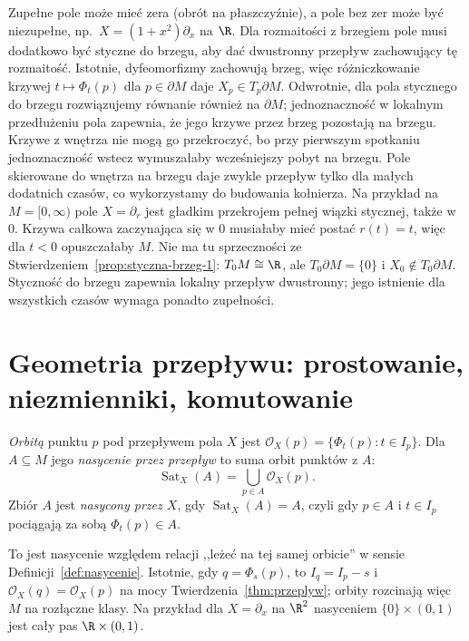 \begin{uwaga}
Zupełne pole może mieć zera (obrót na płaszczyźnie), a pole bez zer
może być niezupełne, np.\ $X=(1+x^2)\partial_x$ na $\R$.
Dla rozmaitości z brzegiem pole musi dodatkowo być styczne do brzegu,
aby dać dwustronny przepływ zachowujący tę rozmaitość.
Istotnie, dyfeomorfizmy zachowują brzeg, więc różniczkowanie
krzywej $t\mapsto\Phi_t(p)$ dla $p\in\partial M$ daje
$X_p\in T_p\partial M$. Odwrotnie, dla pola stycznego do brzegu
rozwiązujemy równanie również na $\partial M$; jednoznaczność
w lokalnym przedłużeniu pola zapewnia, że jego krzywe przez
brzeg pozostają na brzegu. Krzywe z wnętrza nie mogą go
przekroczyć, bo przy pierwszym spotkaniu jednoznaczność wstecz
wymuszałaby wcześniejszy pobyt na brzegu.
Pole skierowane do wnętrza na brzegu daje zwykle przepływ tylko
dla małych dodatnich czasów, co wykorzystamy do budowania kołnierza.
Na przykład na $M=[0,\infty)$ pole $X=\partial_r$ jest gładkim
przekrojem pełnej wiązki stycznej, także w $0$.
Krzywa całkowa zaczynająca się w $0$ musiałaby mieć postać
$r(t)=t$, więc dla $t<0$ opuszczałaby $M$.
Nie ma tu sprzeczności ze Stwierdzeniem~\ref{prop:styczna-brzeg-1}:
$T_0M\cong\R$, ale $T_0\partial M=\{0\}$ i $X_0\notin T_0\partial M$.
Styczność do brzegu zapewnia lokalny przepływ dwustronny;
jego istnienie dla wszystkich czasów wymaga ponadto zupełności.
\end{uwaga}

\section{Geometria przepływu: prostowanie, niezmienniki, komutowanie}
\label{sec:prostowanie}

\begin{definicja}
\emph{Orbitą} punktu $p$ pod przepływem pola $X$ jest
$\mathcal O_X(p)=\{\Phi_t(p):t\in I_p\}$.
Dla $A\subseteq M$ jego \emph{nasycenie przez przepływ}
to suma orbit punktów z $A$:
\[
 \operatorname{Sat}_X(A)=\bigcup_{p\in A}\mathcal O_X(p).
\]
Zbiór $A$ jest \emph{nasycony przez $X$}, gdy
$\operatorname{Sat}_X(A)=A$, czyli gdy
$p\in A$ i $t\in I_p$ pociągają za sobą
$\Phi_t(p)\in A$.
\end{definicja}

To jest nasycenie względem relacji ,,leżeć na tej samej
orbicie'' w sensie Definicji~\ref{def:nasycenie}.
Istotnie, gdy $q=\Phi_s(p)$, to
$I_q=I_p-s$ i $\mathcal O_X(q)=\mathcal O_X(p)$
na mocy Twierdzenia~\ref{thm:przeplyw}; orbity rozcinają
więc $M$ na rozłączne klasy. Na przykład dla
$X=\partial_x$ na $\R^2$ nasyceniem
$\{0\}\times(0,1)$ jest cały pas $\R\times(0,1)$.

